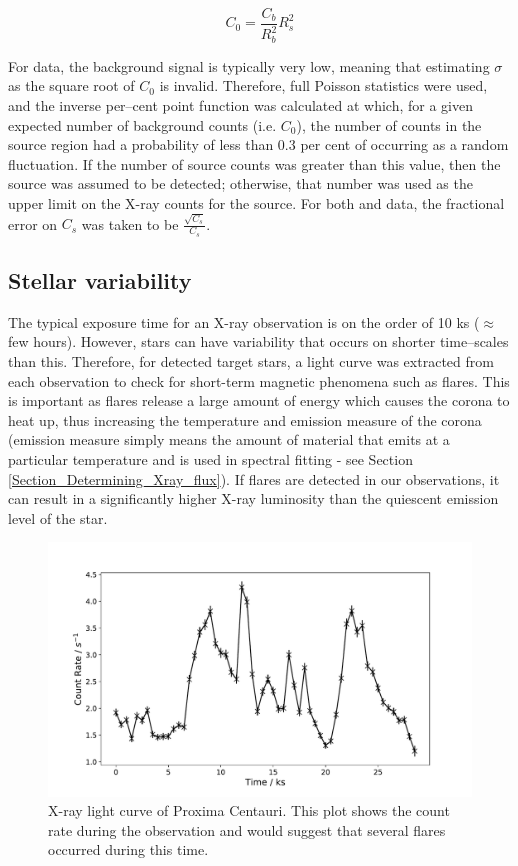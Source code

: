 \begin{equation}
    C_{0} = \frac{C_{b}}{R_{b}^{2}}R_{s}^{2}
    \label{Eq:C0_equation}
\end{equation}

For \Chandra data, the background signal is typically very low, meaning that estimating $\sigma$ as the square root of $C_{0}$ is invalid. Therefore, full Poisson statistics were used, and the inverse per--cent point function was calculated at which, for a given expected number of background counts (i.e. $C_{0}$), the number of counts in the source region had a probability of less than 0.3 per cent of occurring as a random fluctuation. If the number of source counts was greater than this value, then the source was assumed to be detected; otherwise, that number was used as the upper limit on the X-ray counts for the source. For both \Chandra and \XMM data, the fractional error on $C_{s}$ was taken to be $\frac{\sqrt{C_{s}}}{C_{s}}$.

\subsection{Stellar variability}
The typical exposure time for an X-ray observation is on the order of 10 ks ($\approx$ few hours). However, stars can have variability that occurs on shorter time--scales than this. Therefore, for detected target stars, a light curve was extracted from each observation to check for short-term magnetic phenomena such as flares. This is important as flares release a large amount of energy which causes the corona to heat up, thus increasing the temperature and emission measure of the corona (emission measure simply means the amount of material that emits at a particular temperature and is used in spectral fitting - see Section \ref{Section_Determining_Xray_flux}). If flares are detected in our observations, it can result in a significantly higher X-ray luminosity than the quiescent emission level of the star.

\begin{figure}
    \centering
    \includegraphics[scale=0.55]{Figures/3-Xray_age/proxima_cen_lc.pdf}
    \caption[X-ray light curve of Proxima Centauri]{X-ray light curve of Proxima Centauri. This plot shows the count rate during the observation and would suggest that several flares occurred during this time.}
    \label{fig:proxima_cen_lc}
\end{figure}

